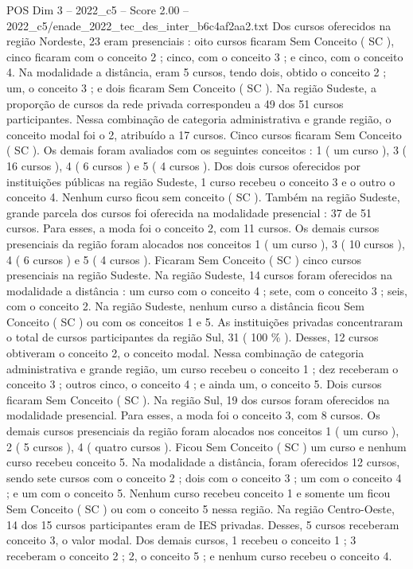 \begin{textsample}{POS Dim 3 – 2022\_c5 – Score 2.00 – 2022\_c5/enade\_2022\_tec\_des\_inter\_b6c4af2aa2.txt}
Dos cursos oferecidos na região Nordeste, 23 eram presenciais : oito cursos ficaram Sem Conceito ( SC ), cinco ficaram com o conceito 2 ; cinco, com o conceito 3 ; e cinco, com o conceito 4.
Na modalidade a distância, eram 5 cursos, tendo dois, obtido o conceito 2 ; um, o conceito 3 ; e dois ficaram Sem Conceito ( SC ).
Na região Sudeste, a proporção de cursos da rede privada correspondeu a 49 dos 51 cursos participantes.
Nessa combinação de categoria administrativa e grande região, o conceito modal foi o 2, atribuído a 17 cursos.
Cinco cursos ficaram Sem Conceito ( SC ).
Os demais foram avaliados com os seguintes conceitos : 1 ( um curso ), 3 ( 16 cursos ), 4 ( 6 cursos ) e 5 ( 4 cursos ).
Dos dois cursos oferecidos por instituições públicas na região Sudeste, 1 curso recebeu o conceito 3 e o outro o conceito 4.
Nenhum curso ficou sem conceito ( SC ).
Também na região Sudeste, grande parcela dos cursos foi oferecida na modalidade presencial : 37 de 51 cursos.
Para esses, a moda foi o conceito 2, com 11 cursos.
Os demais cursos presenciais da região foram alocados nos conceitos 1 ( um curso ), 3 ( 10 cursos ), 4 ( 6 cursos ) e 5 ( 4 cursos ).
Ficaram Sem Conceito ( SC ) cinco cursos presenciais na região Sudeste.
Na região Sudeste, 14 cursos foram oferecidos na modalidade a distância : um curso com o conceito 4 ; sete, com o conceito 3 ; seis, com o conceito 2.
Na região Sudeste, nenhum curso a distância ficou Sem Conceito ( SC ) ou com os conceitos 1 e 5.
As instituições privadas concentraram o total de cursos participantes da região Sul, 31 ( 100 \% ).
Desses, 12 cursos obtiveram o conceito 2, o conceito modal.
Nessa combinação de categoria administrativa e grande região, um curso recebeu o conceito 1 ; dez receberam o conceito 3 ; outros cinco, o conceito 4 ; e ainda um, o conceito 5.
Dois cursos ficaram Sem Conceito ( SC ).
Na região Sul, 19 dos cursos foram oferecidos na modalidade presencial.
Para esses, a moda foi o conceito 3, com 8 cursos.
Os demais cursos presenciais da região foram alocados nos conceitos 1 ( um curso ), 2 ( 5 cursos ), 4 ( quatro cursos ).
Ficou Sem Conceito ( SC ) um curso e nenhum curso recebeu conceito 5.
Na modalidade a distância, foram oferecidos 12 cursos, sendo sete cursos com o conceito 2 ; dois com o conceito 3 ; um com o conceito 4 ; e um com o conceito 5.
Nenhum curso recebeu conceito 1 e somente um ficou Sem Conceito ( SC ) ou com o conceito 5 nessa região.
Na região Centro-Oeste, 14 dos 15 cursos participantes eram de IES privadas.
Desses, 5 cursos receberam conceito 3, o valor modal.
Dos demais cursos, 1 recebeu o conceito 1 ; 3 receberam o conceito 2 ; 2, o conceito 5 ; e nenhum curso recebeu o conceito 4.

\end{textsample}
